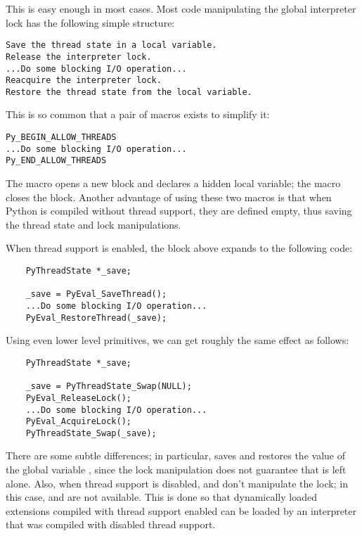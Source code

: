 This is easy enough in most cases.  Most code manipulating the global
interpreter lock has the following simple structure:

\begin{verbatim}
Save the thread state in a local variable.
Release the interpreter lock.
...Do some blocking I/O operation...
Reacquire the interpreter lock.
Restore the thread state from the local variable.
\end{verbatim}

This is so common that a pair of macros exists to simplify it:

\begin{verbatim}
Py_BEGIN_ALLOW_THREADS
...Do some blocking I/O operation...
Py_END_ALLOW_THREADS
\end{verbatim}

The
macro opens a new block and declares a hidden local variable; the
macro closes the block.  Another advantage of using these two macros
is that when Python is compiled without thread support, they are
defined empty, thus saving the thread state and lock manipulations.

When thread support is enabled, the block above expands to the
following code:

\begin{verbatim}
    PyThreadState *_save;

    _save = PyEval_SaveThread();
    ...Do some blocking I/O operation...
    PyEval_RestoreThread(_save);
\end{verbatim}

Using even lower level primitives, we can get roughly the same effect
as follows:

\begin{verbatim}
    PyThreadState *_save;

    _save = PyThreadState_Swap(NULL);
    PyEval_ReleaseLock();
    ...Do some blocking I/O operation...
    PyEval_AcquireLock();
    PyThreadState_Swap(_save);
\end{verbatim}

There are some subtle differences; in particular,
 saves
and restores the value of the  global variable
, since the lock manipulation does not
guarantee that  is left alone.  Also, when thread support
is disabled,
 and
 don't manipulate the lock; in this
case,  and
 are not
available.  This is done so that dynamically loaded extensions
compiled with thread support enabled can be loaded by an interpreter
that was compiled with disabled thread support.

